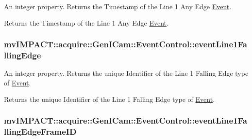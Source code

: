 An integer property. Returns the Timestamp of the Line 1 Any Edge \hyperlink{classmv_i_m_p_a_c_t_1_1acquire_1_1_event}{Event}. 

Returns the Timestamp of the Line 1 Any Edge \hyperlink{classmv_i_m_p_a_c_t_1_1acquire_1_1_event}{Event}. \hypertarget{classmv_i_m_p_a_c_t_1_1acquire_1_1_gen_i_cam_1_1_event_control_a8dc538a2ece5d23c4c48b4c2c8e26336}{
\subsubsection[{event\+Line1\+Falling\+Edge}]{ mv\+I\+M\+P\+A\+C\+T\+::acquire\+::\+Gen\+I\+Cam\+::\+Event\+Control\+::event\+Line1\+Falling\+Edge}}\label{classmv_i_m_p_a_c_t_1_1acquire_1_1_gen_i_cam_1_1_event_control_a8dc538a2ece5d23c4c48b4c2c8e26336}


An integer property. Returns the unique Identifier of the Line 1 Falling Edge type of \hyperlink{classmv_i_m_p_a_c_t_1_1acquire_1_1_event}{Event}. 

Returns the unique Identifier of the Line 1 Falling Edge type of \hyperlink{classmv_i_m_p_a_c_t_1_1acquire_1_1_event}{Event}. \hypertarget{classmv_i_m_p_a_c_t_1_1acquire_1_1_gen_i_cam_1_1_event_control_a0b163246a3099493cfab15e039f4caaf}{
\subsubsection[{event\+Line1\+Falling\+Edge\+Frame\+I\+D}]{ mv\+I\+M\+P\+A\+C\+T\+::acquire\+::\+Gen\+I\+Cam\+::\+Event\+Control\+::event\+Line1\+Falling\+Edge\+Frame\+I\+D}}\label{classmv_i_m_p_a_c_t_1_1acquire_1_1_gen_i_cam_1_1_event_control_a0b163246a3099493cfab15e039f4caaf}


